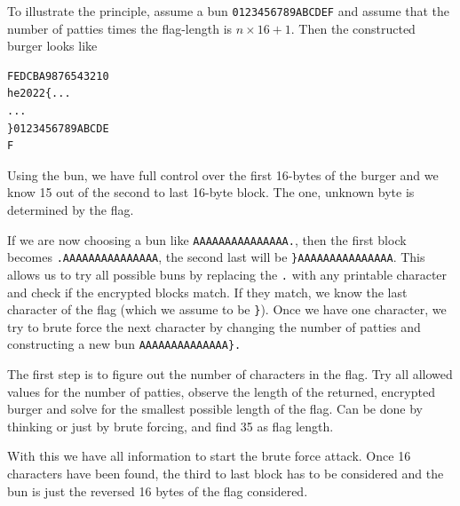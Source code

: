 To illustrate the principle, assume a bun \verb+0123456789ABCDEF+ and assume
that the number of patties times the flag-length is $n\times 16 + 1$.  Then the 
constructed burger looks like
\noindent
\begin{verbatim}
FEDCBA9876543210
he2022{...
...
}0123456789ABCDE
F
\end{verbatim}
\noindent
Using the bun, we have full control over the first 16-bytes of the burger and we know 15
out of the second to last 16-byte block.  The one, unknown byte is determined by the flag. 

If we are now choosing a bun like \verb+AAAAAAAAAAAAAAA.+, then the 
first block becomes \verb+.AAAAAAAAAAAAAAA+, the second last will be
\verb+}AAAAAAAAAAAAAAA+.  This allows us to try all possible buns by 
replacing the \verb+.+ with any printable character and check if the encrypted
blocks match.  If they match, we know the last character of the flag (which we 
assume to be \verb+}+).  Once we have one character, we try to brute force
the next character by changing the number of patties and constructing a new 
bun \verb+AAAAAAAAAAAAAA}.+

The first step is to figure out the number of characters in the flag.  Try all
allowed values for the number of patties, observe the length of the returned, 
encrypted burger and solve for the smallest possible length of the flag.  Can 
be done by thinking or just by brute forcing, and find 35 as flag length.

With this we have all information to start the brute force attack.  Once 16
characters have been found, the third to last block has to be considered and
the bun is just the reversed 16 bytes of the flag considered.

